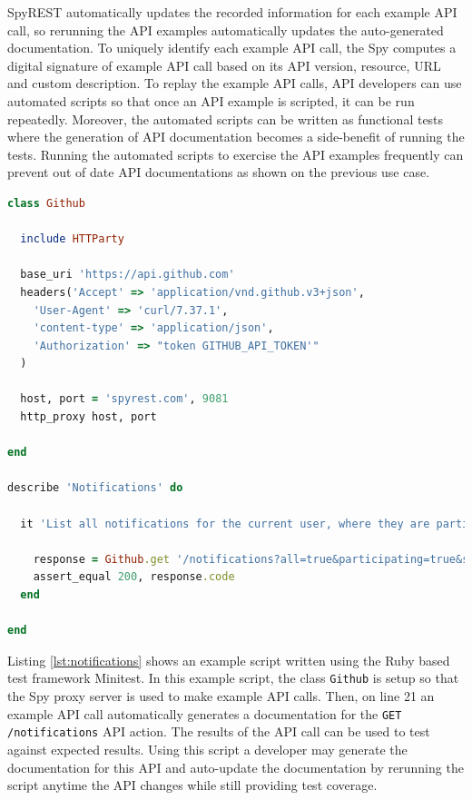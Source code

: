 \documentclass[conference]{IEEEtran}
\begin{document}
SpyREST automatically updates the recorded information for each example API call, so rerunning the API examples automatically updates the auto-generated documentation. To uniquely identify each example API call, the Spy computes a digital signature of example API call based on its API version, resource, URL and custom description. To replay the example API calls, API developers can use automated scripts so that once an API example is scripted, it can be run repeatedly. Moreover, the automated scripts can be written as functional tests where the generation of API documentation becomes a side-benefit of running the tests. Running the automated scripts to exercise the API examples frequently can prevent out of date API documentations as shown on the previous use case.

\begin{lstlisting}[language=ruby, breaklines=true, caption={}, label=list:ex, float,floatplacement=H, caption=Example API call using SpyREST, label={lst:notifications}]
class Github

  include HTTParty

  base_uri 'https://api.github.com'
  headers('Accept' => 'application/vnd.github.v3+json',
    'User-Agent' => 'curl/7.37.1',
    'content-type' => 'application/json',
    'Authorization' => "token GITHUB_API_TOKEN'"
  )

  host, port = 'spyrest.com', 9081
  http_proxy host, port

end

describe 'Notifications' do

  it 'List all notifications for the current user, where they are participating, since a time' do

    response = Github.get '/notifications?all=true&participating=true&since=2014-01-01T00:00:00Z'
    assert_equal 200, response.code
  end

end\end{lstlisting}

Listing \ref{lst:notifications} shows an example script written using the Ruby based test framework Minitest. In this example script, the class \texttt{Github} is setup so that the Spy proxy server is used to make example API calls. Then, on line 21 an example API call automatically generates a documentation for the \texttt{GET /notifications} API action. The results of the API call can be used to test against expected results. Using this script a developer may generate the documentation for this API and auto-update the documentation by rerunning the script anytime the API changes while still providing test coverage.
\end{document}

